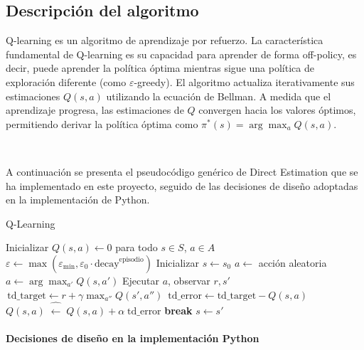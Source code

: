 \subsection{Descripción del algoritmo}

Q-learning es un algoritmo de aprendizaje por refuerzo. La característica fundamental de Q-learning es su capacidad para aprender de forma off-policy, es decir, puede aprender la política óptima mientras sigue una política de exploración diferente (como $\varepsilon$-greedy). El algoritmo actualiza iterativamente sus estimaciones $Q(s,a)$ utilizando la ecuación de Bellman. A medida que el aprendizaje progresa, las estimaciones de $Q$ convergen hacia los valores óptimos, permitiendo derivar la política óptima como $\pi^*(s) = \arg\max_a Q(s,a)$.

\

A continuación se presenta el pseudocódigo genérico de Direct Estimation que se ha implementado en este proyecto, seguido de las decisiones de diseño adoptadas en la implementación de Python.

\begin{algorithm}[H]
  \caption{Q-Learning}
  \begin{algorithmic}[1]
    \State Inicializar $Q(s,a)\gets 0$ para todo $s\in S$, $a\in A$
      \State $\varepsilon \gets \max(\varepsilon_{\min}, \varepsilon_0\cdot\text{decay}^{\text{episodio}})$
      \State Inicializar $s\gets s_0$
          \State $a\gets$ acción aleatoria
        \Else
          \State $a\gets \arg\max_{a'} Q(s,a')$
        \EndIf
        \State Ejecutar $a$, observar $r,s'$
        \State $\,\text{td\_target}\gets r + \gamma \max_{a''}Q(s',a'')$
        \State $\,\text{td\_error}\gets \text{td\_target} - Q(s,a)$
        \State $Q(s,a)\;\widehat{\gets}\;Q(s,a) + \alpha\;\text{td\_error}$
          \State \textbf{break}
        \EndIf
        \State $s\gets s'$
      \EndFor
    \EndFor
  \end{algorithmic}
\end{algorithm}

\paragraph*{Decisiones de diseño en la implementación Python}

